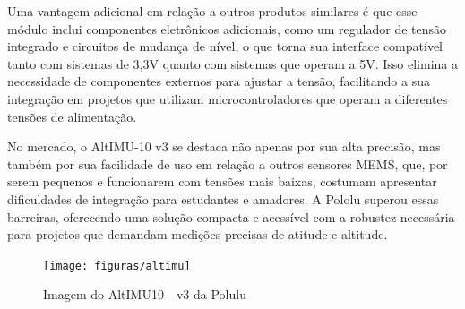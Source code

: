 \documentclass[
	12pt,				%
	openright,			%
	oneside,			%
	a4paper,			%
	english,			%
	brazil				%
	]{abntex2}
\begin{document}
\begin{table}[]
	\caption{Tabela de endereçamento de cada Barramento I²C}
	\label{tab:endereco}
\end{table}


Uma vantagem adicional em relação a outros produtos similares é que esse módulo inclui componentes eletrônicos adicionais, como um regulador de tensão integrado e circuitos de mudança de nível, o que torna sua interface compatível tanto com sistemas de 3,3V quanto com sistemas que operam a 5V. Isso elimina a necessidade de componentes externos para ajustar a tensão, facilitando a sua integração em projetos que utilizam microcontroladores que operam a diferentes tensões de alimentação.

No mercado, o AltIMU-10 v3 se destaca não apenas por sua alta precisão, mas também por sua facilidade de uso em relação a outros sensores MEMS, que, por serem pequenos e funcionarem com tensões mais baixas, costumam apresentar dificuldades de integração para estudantes e amadores. A Pololu superou essas barreiras, oferecendo uma solução compacta e acessível com a robustez necessária para projetos que demandam medições precisas de atitude e altitude. \cite{Polulu2024}

\begin{figure}[h]
	\centering
	\texttt{[image: figuras/altimu]}
	\caption[AltIMU10 - v3]{Imagem do AltIMU10 - v3 da Polulu}
	\label{fig:altimu}
\end{figure}
\end{document}
